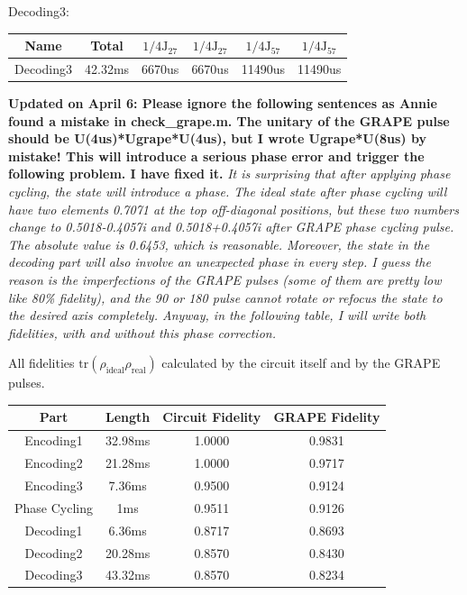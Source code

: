 Decoding3:
\begin{table}[!h]
\begin{tabular} {c||c|c|c|c|c}
  \hline
   Name & Total & $1/4\text{J}_{27}$ & $1/4\text{J}_{27}$ & $1/4\text{J}_{57}$ & $1/4\text{J}_{57}$\\
  \hline
 Decoding3 & 42.32ms & 6670us & 6670us & 11490us & 11490us\\
  \hline
\end{tabular}
\end{table}

\textbf{Updated on April 6: Please ignore the following sentences as Annie found a mistake in check\_grape.m. The unitary of the GRAPE pulse should be U(4us)*Ugrape*U(4us), but I wrote Ugrape*U(8us) by mistake! This will introduce a serious phase error and trigger the following problem. I have fixed it.}
\emph{It is surprising that after applying phase cycling, the state will introduce a phase. The ideal state after phase cycling will have two elements 0.7071 at the top off-diagonal positions, but these two numbers change to 0.5018-0.4057i and  0.5018+0.4057i after GRAPE phase cycling pulse. The absolute value is 0.6453, which is reasonable. Moreover, the state in the decoding part will also involve an unexpected phase in every step. I guess the reason is the imperfections of the GRAPE pulses (some of them are pretty low like 80\% fidelity), and the 90 or 180 pulse cannot rotate or refocus the state to the desired axis completely. Anyway, in the following table, I will write both fidelities, with and without this phase correction.}

All fidelities $\text{tr}(\rho_\text{{ideal}}\rho_\text{real})$ calculated by the circuit itself and by the GRAPE pulses.
\begin{table}[!h]
\begin{tabular} {c||c|c|c}
  \hline
   Part & Length & Circuit Fidelity & GRAPE Fidelity\\
  \hline
 Encoding1 & 32.98ms & 1.0000 & 0.9831\\
 Encoding2 & 21.28ms & 1.0000 & 0.9717\\
 Encoding3 & 7.36ms & 0.9500 & 0.9124\\
 Phase Cycling & 1ms & 0.9511 & 0.9126\\
 Decoding1 & 6.36ms & 0.8717 & 0.8693\\
 Decoding2 & 20.28ms & 0.8570 & 0.8430\\
 Decoding3 & 43.32ms & 0.8570 & 0.8234\\
  \hline
\end{tabular}
\end{table}

